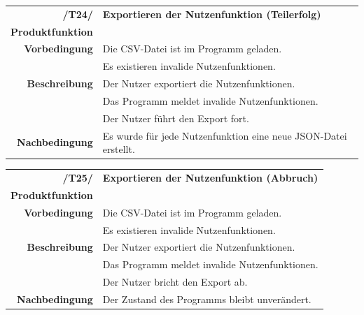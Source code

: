 \documentclass{article}
\begin{document}
\begin{table}[H]
\begin{tabularx}{\textwidth}{rX}
\vspace{1mm}
\textbf{/T24/}         & \textbf{Exportieren der Nutzenfunktion (Teilerfolg)} \\ \vspace{1mm}
\textbf{Produktfunktion} & \nameref{sec:f:Alternativen exportieren} \\
\textbf{Vorbedingung}  & Die CSV-Datei ist im Programm geladen. \\  \vspace{1mm}& Es existieren invalide Nutzenfunktionen. \\
\textbf{Beschreibung}  & Der Nutzer exportiert die Nutzenfunktionen. \\ & Das Programm meldet invalide Nutzenfunktionen. \\ \vspace{1mm} & Der Nutzer führt den Export fort. \\
\textbf{Nachbedingung} & Es wurde für jede Nutzenfunktion eine neue JSON-Datei erstellt.
\end{tabularx}
\end{table}

\begin{table}[H]
\begin{tabularx}{\textwidth}{rX}
\vspace{1mm}
\textbf{/T25/}         & \textbf{Exportieren der Nutzenfunktion (Abbruch)} \\ \vspace{1mm}
\textbf{Produktfunktion} & \nameref{sec:f:Alternativen exportieren} \\
\textbf{Vorbedingung}  & Die CSV-Datei ist im Programm geladen. \\  \vspace{1mm}& Es existieren invalide Nutzenfunktionen. \\
\textbf{Beschreibung}  & Der Nutzer exportiert die Nutzenfunktionen. \\ & Das Programm meldet invalide Nutzenfunktionen. \\ \vspace{1mm} & Der Nutzer bricht den Export ab. \\
\textbf{Nachbedingung} & Der Zustand des Programms bleibt unverändert.
\end{tabularx}
\end{table}
\end{document}
